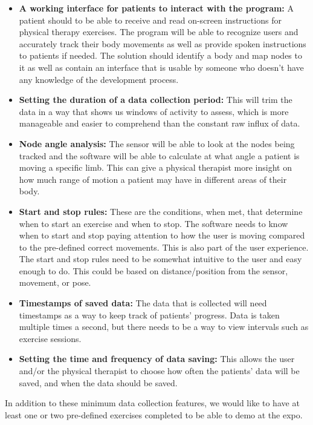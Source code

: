 \documentclass[onecolumn, draftclsnofoot,10pt, compsoc]{IEEEtran}
\begin{document}
\begin{itemize}
    \item \textbf{A working interface for patients to interact with the program:} A patient should to be able to receive and read on-screen instructions for physical therapy exercises. The program will be able to recognize users and accurately track their body movements as well as provide spoken instructions to patients if needed. The solution should identify a body and map nodes to it as well as contain an interface that is usable by someone who doesn't have any knowledge of the development process.
    \item \textbf{Setting the duration of a data collection period:} This will trim the data in a way that shows us windows of activity to assess, which is more manageable and easier to comprehend than the constant raw influx of data.
    \item \textbf{Node angle analysis:} The sensor will be able to look at the nodes being tracked and the software will be able to calculate at what angle a patient is moving a specific limb. This can give a physical therapist more insight on how much range of motion a patient may have in different areas of their body. 
    \item \textbf{Start and stop rules:} These are the conditions, when met, that determine when to start an exercise and when to stop. The software needs to know when to start and stop paying attention to how the user is moving compared to the pre-defined correct movements. This is also part of the user experience. The start and stop rules need to be somewhat intuitive to the user and easy enough to do. This could be based on distance/position from the sensor, movement, or pose.
    \item \textbf{Timestamps of saved data:} The data that is collected will need timestamps as a way to keep track of patients' progress. Data is taken multiple times a second, but there needs to be a way to view intervals such as exercise sessions.
    \item \textbf{Setting the time and frequency of data saving:} This allows the user and/or the physical therapist to choose how often the patients' data will be saved, and when the data should be saved.
\end{itemize}
In addition to these minimum data collection features, we would like to have at least one or two pre-defined exercises completed to be able to demo at the expo.
\end{document}
